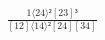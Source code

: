 \documentclass[varwidth, border=5pt]{standalone}
\begin{document}
\begin{my}
$\begin{gathered}
\scriptscriptstyle\frac{1⟨24⟩²[23]³}{[12]⟨14⟩²[24][34]}
\end{gathered}$
\end{my}
\end{document}
